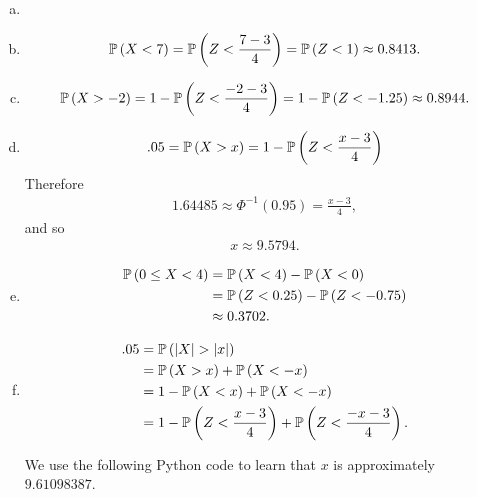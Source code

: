 \begin{ex}
  \begin{enumerate}[(a)]
    \item[]
    \item
          \begin{align*}
            \P{X<7}
            =\P{Z<\frac{7 - 3}{4}}
            =\P{Z<1}
            \approx 0.8413.
          \end{align*}
    \item
          \begin{align*}
            \P{X>-2}
            =1-\P{Z<\frac{-2 - 3}{4}}
            =1 - \P{Z<-1.25}
            \approx 0.8944.
          \end{align*}
    \item
          \begin{align*}
            .05
            =\P{X>x}
            =1-\P{Z<\frac{x-3}{4}}
          \end{align*}
          Therefore
          \begin{align*}
            1.64485\approx \Phi^{-1}(0.95)=\frac{x-3}{4},
          \end{align*}
          and so
          \begin{align*}
            x\approx 9.5794.
          \end{align*}

    \item
          \begin{align*}
            \P{0\leq X < 4}
             & =\P{X<4}-\P{X < 0}          \\
             & =\P{Z < 0.25}-\P{Z < -0.75} \\
             & \approx 0.3702.
          \end{align*}
    \item
          \begin{align*}
            .05
             & =\P{|X|>|x|}                                 \\
             & =\P{X>x}+\P{X<-x}                            \\
             & =1-\P{X<x}+\P{X<-x}                          \\
             & =1-\P{Z<\frac{x-3}{4}}+\P{Z<\frac{-x-3}{4}}.
          \end{align*}

          We use the following Python code to learn that $x$ is
          approximately $9.61098387$.

          \inputminted{python}{../code/02-18.py}
  \end{enumerate}
\end{ex}

